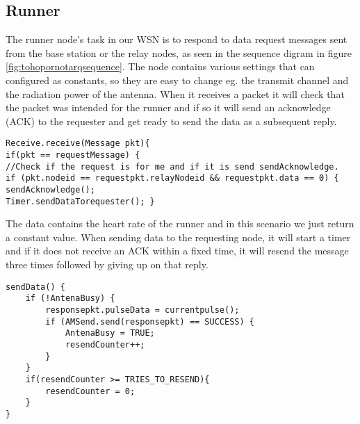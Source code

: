 \subsection{Runner}\label{sc:runner}

The runner node's task in our WSN is to respond to data request messages sent from the base station or the relay nodes, as seen in the sequence digram in figure \ref{fig:tohopornotarqsequence}. The node contains various settings that can configured as constants, so they are easy to change eg. the transmit channel and the radiation power of the antenna. When it receives a packet it will check that the packet was intended for the runner and if so it will send an acknowledge (ACK) to the requester and get ready to send the data as a subsequent reply.

\begin{lstlisting}[label={lst:runner1}]
Receive.receive(Message pkt){
if(pkt == requestMessage) {
//Check if the request is for me and if it is send sendAcknowledge.
if (pkt.nodeid == requestpkt.relayNodeid && requestpkt.data == 0) {
sendAcknowledge();
Timer.sendDataTorequester(); }
\end{lstlisting}

The data contains the heart rate of the runner and in this scenario we just return a constant value. When sending data to the requesting node, it will start a timer and if it does not receive an ACK within a fixed time, it will resend the message three times followed by giving up on that reply.

\begin{lstlisting}[label={lst:runner2}]
sendData() {
	if (!AntenaBusy) {
		responsepkt.pulseData = currentpulse();
		if (AMSend.send(responsepkt) == SUCCESS) {
			AntenaBusy = TRUE;
			resendCounter++;
		}
	}		
	if(resendCounter >= TRIES_TO_RESEND){
		resendCounter = 0; 
	}
}
\end{lstlisting}

